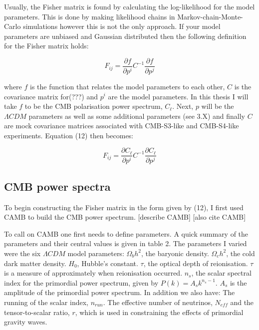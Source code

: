 Usually, the Fisher matrix is found by calculating the log-likelihood for the model parameters. This is done by making likelihood chains in Markov-chain-Monte-Carlo simulations however this is not the only approach. If your model parameters are unbiased and Gaussian distributed then the following definition for the Fisher matrix holds:

\begin{equation}
F_{ij} = \frac{\partial f}{\partial p^i} C^{-1} \frac{\partial f}{\partial p^j}
\end{equation}

where $f$ is the function that relates the model parameters to each other, $C$ is the covariance matrix for(???) and $p^{i}$ are the model parameters. In this thesis I will take $f$ to be the CMB polarisation power spectrum, $C_{\ell}$. Next, ${p}$ will be the $\Lambda CDM$ parameters as well as some additional parameters (see 3.X) and finally $C$ are mock covariance matrices associated with CMB-S3-like and CMB-S4-like experiments. Equation (12) then becomes:

\begin{equation}
F_{ij} = \frac{\partial C_{\ell}}{\partial p^i} C^{-1} \frac{\partial C_{\ell}}{\partial p^j}
\end{equation}

\subsection{CMB power spectra}

To begin constructing the Fisher matrix in the form given by (12), I first used CAMB to build the CMB power spectrum. [describe CAMB] [also cite CAMB]

To call on CAMB one first needs to define parameters. A quick summary of the parameters and their central values is given in table 2. The parameters I varied were the six $\Lambda CDM$ model parameters: $\Omega_{b}h^{2}$, the baryonic density. $\Omega_{c}h^{2}$, the cold dark matter density. $H_0$, Hubble's constant. $\tau$, the optical depth of reionisation. $\tau$ is a measure of approximately when reionisation occurred. $n_s$, the scalar spectral index for the primordial power spectrum, given by $P(k) = A_s k^{n_s - 1}$. $A_s$ is the amplitude of the primordial power spectrum. In addition we also have: The running of the scalar index, $n_{run}$. The effective number of neutrinos, $N_{eff}$ and the tensor-to-scalar ratio, $r$, which is used in constraining the effects of primordial gravity waves.

